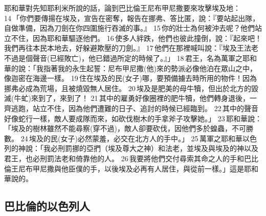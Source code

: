 \begin{itemize}
耶和華對先知耶利米所說的話，論到巴比倫王尼布甲尼撒要來攻擊埃及地：14 「你們要傳揚在埃及，宣告在密奪，報告在挪弗、答比匿，說：『要站起出隊，自做準備，因為刀劍在你四圍施行吞滅的事。』 15 你的壯士為何被沖去呢？他們站立不住，因為耶和華驅逐他們。 16 使多人絆跌，他們也彼此撞倒，說：『起來吧！我們再往本民本地去，好躲避欺壓的刀劍。』 17 他們在那裡喊叫說：『埃及王法老不過是個聲音(已經敗亡)，他已錯過所定的時候了。』」 18 君王，名為萬軍之耶和華的說：「我指著我的永生起誓：尼布甲尼撒(他)來的勢派必像他泊在眾山之中，像迦密在海邊一樣。 19 住在埃及的民(女子)哪，要預備擄去時所用的物件！因為挪弗必成為荒場，且被燒毀無人居住。 20 埃及是肥美的母牛犢，但出於北方的毀滅(牛虻)來到了，來到了！ 21 其中的雇勇好像圈裡的肥牛犢，他們轉身退後，一齊逃跑，站立不住，因為他們遭難的日子、追討的時候已經臨到。 22 其中的聲音好像蛇行一樣，敵人要成隊而來，如砍伐樹木的手拿斧子攻擊她。」 23 耶和華說：「埃及的樹林雖然不能尋察(穿不過)，敵人卻要砍伐，因他們多於蝗蟲，不可勝數。 24 埃及的民(女子)必然蒙羞，必交在北方人的手中。」 25 萬軍之耶和華以色列的神說：「我必刑罰挪的亞捫（埃及尊大之神）和法老，並埃及與埃及的神以及君王，也必刑罰法老和倚靠他的人。 26 我要將他們交付尋索其命之人的手和巴比倫王尼布甲尼撒與他臣僕的手，以後埃及必再有人居住，與從前一樣。」這是耶和華說的。
\end{itemize}

\subsection{巴比倫的以色列人}
